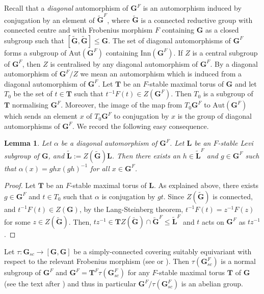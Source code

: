 \documentclass{amsart}
\theoremstyle{plain}\newtheorem{Theorem}{Theorem}[section]
\theoremstyle{plain}\newtheorem{Conjecture}[Theorem]{Conjecture}
\theoremstyle{plain}\newtheorem{Corollary}[Theorem]{Corollary}
\theoremstyle{plain}\newtheorem{Lemma}[Theorem]{Lemma}
\theoremstyle{plain}\newtheorem{Proposition}[Theorem]{Proposition}
\theoremstyle{definition}\newtheorem{Definition}[Theorem]{Definition}
\theoremstyle{definition}\newtheorem{Example}[Theorem]{Example}
\theoremstyle{definition}\newtheorem{Examples}[Theorem]{Examples}
\theoremstyle{definition}\newtheorem{Exercise}[Theorem]{Exercise}
\theoremstyle{definition}\newtheorem{Notation}[Theorem]{Notation}
\theoremstyle{definition}\newtheorem{Remark}[Theorem]{Remark}
\theoremstyle{definition}\newtheorem{Remarks}[Theorem]{Remarks}
\def\Aut{\mathrm{Aut}}               \def\tenk{\otimes_k}
\def\Inn{\mathrm{Inn}}
\newcommand{\bG}{{\mathbf{G}}}
\newcommand{\bL}{{\mathbf{L}}}
\newcommand{\bT}{{\mathbf{T}}}
\numberwithin{equation}{section}
\begin{document}
 Recall that a  {\it diagonal}  automorphism  of $\bG^F$ is  an  automorphism  induced by conjugation by an element of  $\tilde \bG^F$, where  $\tilde  \bG $ is  a connected reductive  group    with connected centre  and with  Frobenius morphism  $F$   containing $\bG$  as a closed  subgroup such that $[\tilde  \bG, \tilde \bG] \leq  \bG$.  The set of diagonal automorphisms of $\bG^F$ forms a subgroup of $\Aut(\bG^F)  $ containing   $\Inn(\bG^F) $.      If $Z$ is a central subgroup  of $\bG^F$,  then  $Z$ is centralised by any diagonal automorphism  of $\bG^F$. By a  diagonal  automorphism  of  $\bG^F/Z$   we mean an automorphism which is   induced from a  diagonal automorphism of  $\bG^F$.   Let $\bT$  be  an $F$-stable   maximal torus of   $\bG$ and  let $ T_0$  be the  set of $ t\in \bT $ 
such that $t^{-1} F(t)  \in  Z(\bG^F)$. Then  $T_0$ is  a subgroup of $\bT$    normalising  $\bG^F$. Moreover,  the  image of  the map from $T_0\bG^F $  to $\Aut(\bG^F) $  which sends an element $x$ of 
$T_0\bG^F$ to conjugation by  $x$   is the group of  diagonal automorphisms   of  $\bG^F$.    We record the following  easy consequence.

\begin{Lemma} \label{lem:diagonalLevi}   Let  $\alpha $ be a diagonal automorphism of $\bG^F$.  Let $\bL $ be an $F$-stable Levi subgroup of  $\bG$, and  $\tilde \bL:= Z(\tilde \bG) \bL $.  Then  there exists an $h \in \tilde \bL^F$    and  $ g \in  \bG^F$ such that 
$\alpha (x) =  gh x (gh)^{-1}$  for all $x \in \bG^F$.
\end{Lemma}

\begin{proof}  Let  $\bT $  be an $F$-stable maximal torus of  $\bL$.     As explained above,   there exists  $g \in \bG^F $   and $ t \in T_0 $  such that  $\alpha $  is conjugation by $g t$. Since $Z(\tilde \bG)$ is connected,  and  $ t^{-1}F(t) \in  Z(\bG) $, by the Lang-Steinberg theorem,  
$t^{-1}F(t) = z^{-1} F(z) $   for some $ z \in  Z(\tilde \bG)$.  Then, $tz^{-1} \in  \bT Z(\tilde \bG) \cap  \tilde \bG^F \leq \tilde \bL^F $ and  $t$  acts on $\bG^F$  as  $tz^{-1}$. 
\end{proof}

Let $\tau: \bG_{sc}  \to  [\bG, \bG] $ be a  simply-connected covering    suitably equivariant with respect to  the  relevant Frobenius   morphism  (see  \cite[Sec.~8.1]{CaEnbook}  or \cite[Sec.~3] {FK}).    Then  $\tau (\bG_{sc}^F) $ is  a  normal subgroup of $\bG^F$ and  $ \bG^F =  \bT^F \tau (\bG^F_{sc} )$   for any $F$-stable maximal torus $\bT$ of $\bG$ (see   the text after  \cite[Rem.~8.18]{CaEnbook})  and  thus in particular 
$\bG^F/\tau(\bG_{sc}^F)$  is an  abelian  group.
\end{document}
